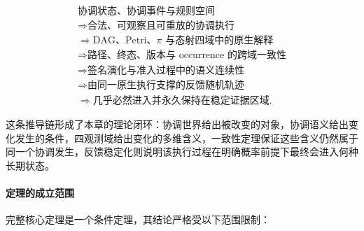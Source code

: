     \begin{equation}
      \boxed{
        \begin{gathered}
          \text{协调状态、协调事件与规则空间}
          \\
          \Longrightarrow
          \text{合法、可观察且可重放的协调执行}
          \\
          \Longrightarrow
          \text{DAG、Petri、$\pi$ 与态射四域中的原生解释}
          \\
          \Longrightarrow
          \text{路径、终态、版本与 occurrence 的跨域一致性}
          \\
          \Longrightarrow
          \text{签名演化与准入过程中的语义连续性}
          \\
          \Longrightarrow
          \text{由同一原生执行支撑的反馈随机轨迹}
          \\
          \Longrightarrow
          \text{几乎必然进入并永久保持在稳定证据区域}.
        \end{gathered}
      }
      \label{eq:cantilune-complete-mathematical-closure}
    \end{equation}

    这条推导链形成了本章的理论闭环：协调世界给出被改变的对象，协调语义给出变化发生的条件，四观测域给出变化的多维含义，一致性定理保证这些含义仍然属于同一个协调发生，反馈稳定化则说明该执行过程在明确概率前提下最终会进入何种长期状态。

    \paragraph{定理的成立范围}

    完整核心定理是一个条件定理，其结论严格受以下范围限制：

